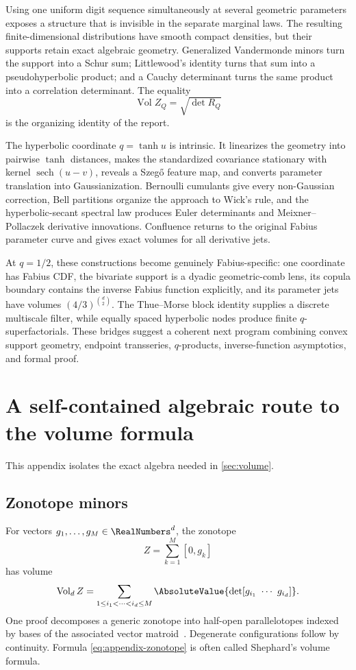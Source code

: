 \documentclass[11pt,a4paper]{article}
\theoremstyle{definition}
\theoremstyle{remark}
\newcommand{\Vol}{\operatorname{Vol}}
\newcommand{\sech}{\operatorname{sech}}
\begin{document}
Using one uniform digit sequence simultaneously at several geometric parameters exposes a structure that is invisible in the separate marginal laws.  The resulting finite-dimensional distributions have smooth compact densities, but their supports retain exact algebraic geometry.  Generalized Vandermonde minors turn the support into a Schur sum; Littlewood's identity turns that sum into a pseudohyperbolic product; and a Cauchy determinant turns the same product into a correlation determinant.  The equality
\[
  \Vol Z_Q=\sqrt{\det R_Q}
\]
is the organizing identity of the report.

The hyperbolic coordinate $q=\tanh u$ is intrinsic.  It linearizes the geometry into pairwise $\tanh$ distances, makes the standardized covariance stationary with kernel $\sech(u-v)$, reveals a Szeg\H{o} feature map, and converts parameter translation into Gaussianization.  Bernoulli cumulants give every non-Gaussian correction, Bell partitions organize the approach to Wick's rule, and the hyperbolic-secant spectral law produces Euler determinants and Meixner--Pollaczek derivative innovations.  Confluence returns to the original Fabius parameter curve and gives exact volumes for all derivative jets.

At $q=1/2$, these constructions become genuinely Fabius-specific: one coordinate has Fabius CDF, the bivariate support is a dyadic geometric-comb lens, its copula boundary contains the inverse Fabius function explicitly, and its parameter jets have volumes $(4/3)^{\binom d2}$.  The Thue--Morse block identity supplies a discrete multiscale filter, while equally spaced hyperbolic nodes produce finite $q$-superfactorials.  These bridges suggest a coherent next program combining convex support geometry, endpoint transseries, $q$-products, inverse-function asymptotics, and formal proof.


\appendix

\section{A self-contained algebraic route to the volume formula}
\label{app:volume-algebra}

This appendix isolates the exact algebra needed in \cref{sec:volume}.

\subsection{Zonotope minors}

For vectors $g_1,\ldots,g_M\in\RealNumbers^d$, the zonotope
\[
  Z=\sum_{k=1}^M[0,g_k]
\]
has volume
\begin{equation}
  \Vol_dZ
   =\sum_{1\le i_1<\cdots<i_d\le M}
      \AbsoluteValue{\det[g_{i_1}\ \cdots\ g_{i_d}]}.
  \label{eq:appendix-zonotope}
\end{equation}
One proof decomposes a generic zonotope into half-open parallelotopes indexed by bases of the associated vector matroid~\cite{Shephard}.  Degenerate configurations follow by continuity.  Formula \eqref{eq:appendix-zonotope} is often called Shephard's volume formula.
\end{document}
